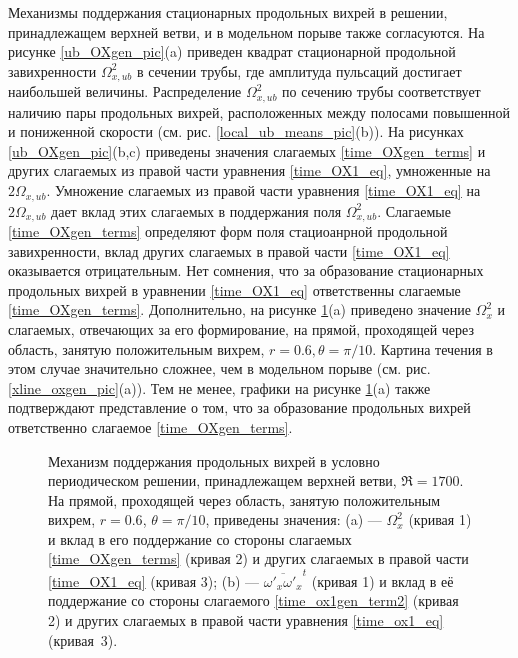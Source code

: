 Механизмы поддержания стационарных продольных вихрей в решении, принадлежащем верхней ветви, и в модельном порыве также согласуются. На рисунке \ref{ub_OXgen_pic}(a) приведен квадрат стационарной продольной завихренности $\Omega_{x, ub}^2$ в сечении трубы, где амплитуда пульсаций достигает наибольшей величины. Распределение $\Omega_{x,ub}^2$ по сечению трубы соответствует наличию пары продольных вихрей, расположенных между полосами повышенной и пониженной скорости (см. рис. \ref{local_ub_means_pic}(b)). На рисунках \ref{ub_OXgen_pic}(b,c) приведены значения слагаемых \eqref{time_OXgen_terms} и других слагаемых из правой части уравнения \eqref{time_OX1_eq}, умноженные на $2\Omega_{x,ub}$. Умножение слагаемых из правой части уравнения \eqref{time_OX1_eq} на $2\Omega_{x,ub}$ дает вклад этих слагаемых в поддержания поля $\Omega_{x,ub}^2$. Слагаемые \eqref{time_OXgen_terms} определяют форм поля стациоанрной продольной завихренности, вклад других слагаемых в правой части \eqref{time_OX1_eq} оказывается отрицательным. Нет сомнения, что за образование стационарных продольных вихрей в уравнении \eqref{time_OX1_eq} ответственны слагаемые \eqref{time_OXgen_terms}. Дополнительно, на рисунке \ref{ub_oxgen_lines_pic}(a) приведено значение $\Omega_x^2$ и слагаемых, отвечающих за его формирование, на прямой, проходящей через область, занятую положительным вихрем, $r = 0.6, \theta = \pi/10$. Картина течения в этом случае значительно сложнее, чем в модельном порыве (см. рис. \ref{xline_oxgen_pic}(a)). Тем не менее, графики на рисунке \ref{ub_oxgen_lines_pic}(a) также подтверждают представление о том, что за образование продольных вихрей ответственно слагаемое \eqref{time_OXgen_terms}. 
 

\begin{figure}
\caption{Механизм поддержания продольных вихрей в условно периодическом решении, принадлежащем верхней ветви, $\Re = 1700$. На прямой, проходящей через область, занятую положительным вихрем, $r = 0.6$, $\theta = \pi/10$, приведены значения: (a) --- $\Omega_x^2$ (кривая 1) и вклад в его поддержание со стороны слагаемых \eqref{time_OXgen_terms} (кривая 2) и других слагаемых в правой части \eqref{time_OX1_eq} (кривая 3); (b) --- $\overline{\omega'_x\omega'_x}^t$ (кривая 1) и вклад в её поддержание со стороны слагаемого \eqref{time_ox1gen_term2} (кривая 2) и других слагаемых в правой части уравнения \eqref{time_ox1_eq} (кривая~3).} 
\label{ub_oxgen_lines_pic}
\end{figure}


